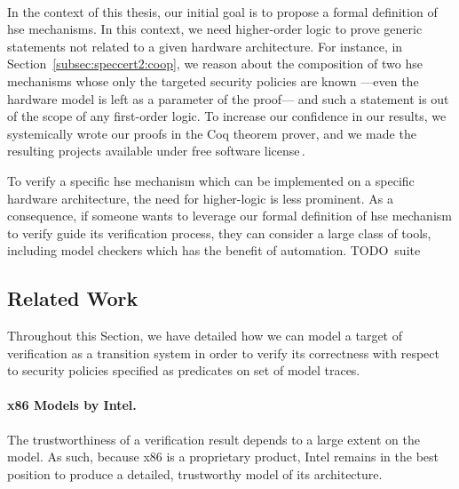 \paragraph*{}
%
In the context of this thesis, our initial goal is to propose a formal
definition of \ac{hse} mechanisms.
%
In this context, we need higher-order logic to prove generic statements not
related to a given hardware architecture.
%
For instance, in Section~\ref{subsec:speccert2:coop}, we reason about the
composition of two \ac{hse} mechanisms whose only the targeted security policies
are known ---even the hardware model is left as a parameter of the proof--- and
such a statement is out of the scope of any first-order logic.
%
To increase our confidence in our results, we systemically wrote our proofs in
the Coq theorem prover, and we made the resulting projects available under free
software license\,\cite{letan2016speccertcode,letan2018freespeccode}.

To verify a specific \ac{hse} mechanism which can be implemented on a specific
hardware architecture, the need for higher-logic is less prominent.
%
As a consequence, if someone wants to leverage our formal definition of \ac{hse}
mechanism to verify guide its verification process, they can consider a large
class of tools, including model checkers which has the benefit of automation.
%
TODO suite

\subsection{Related Work}
\label{subsec:sota:ltsrelated}

%
Throughout this Section, we have detailed how we can model a target of
verification as a transition system in order to verify its correctness with
respect to security policies specified as predicates on set of model traces.
%


\paragraph{x86 Models by Intel.}
%
The trustworthiness of a verification result depends to a large extent on the
model.
%
As such, because x86 is a proprietary product, Intel remains in the best
position to produce a detailed, trustworthy model of its architecture. 

